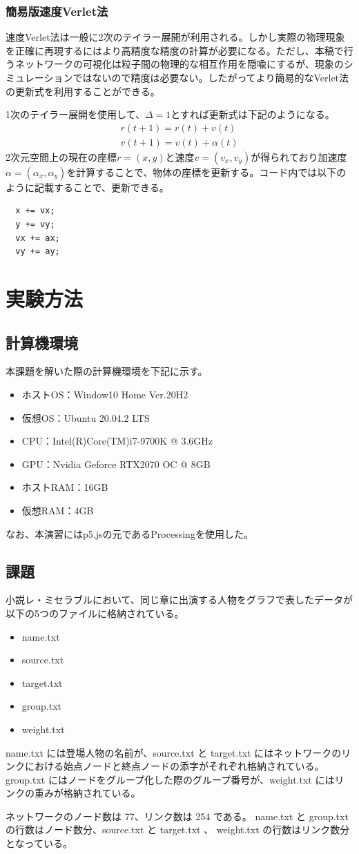 \documentclass[dvipdfmx]{jsarticle}
\begin{document}
\subsubsection{簡易版速度Verlet法}
速度Verlet法は一般に2次のテイラー展開が利用される。しかし実際の物理現象を正確に再現するにはより高精度な精度の計算が必要になる。ただし、本稿で行うネットワークの可視化は粒子間の物理的な相互作用を隠喩にするが、現象のシミュレーションではないので精度は必要ない。したがってより簡易的なVerlet法の更新式を利用することができる。\par
1次のテイラー展開を使用して、$\Delta = 1$とすれば更新式は下記のようになる。
\begin{gather*}
  r(t + 1) = r(t) + v(t)\\
  v(t + 1) = v(t) + \alpha(t)
\end{gather*}
2次元空間上の現在の座標$r = (x, y)$と速度$v = (v_{x}, v_{y})$が得られており加速度$\alpha =(\alpha_{x}, \alpha_{y})$を計算することで、物体の座標を更新する。コード内では以下のように記載することで、更新できる。
\begin{verbatim}
  x += vx;
  y += vy;
  vx += ax;
  vy += ay;
\end{verbatim}
\section{実験方法}
\subsection{計算機環境}
本課題を解いた際の計算機環境を下記に示す。
\begin{itemize}
  \item ホストOS：Window10 Home Ver.20H2
  \item 仮想OS：Ubuntu 20.04.2 LTS
  \item CPU：Intel(R)Core(TM)i7-9700K @ 3.6GHz
  \item GPU：Nvidia Geforce RTX2070 OC @ 8GB
  \item ホストRAM：16GB
  \item 仮想RAM：4GB
\end{itemize}
なお、本演習にはp5.jsの元であるProcessingを使用した。
\subsection{課題}
小説レ・ミセラブルにおいて、同じ章に出演する人物をグラフで表したデータが以下の5つのファイルに格納されている。
\begin{itemize}
  \item name.txt
  \item source.txt
  \item target.txt
  \item group.txt
  \item weight.txt
\end{itemize}
name.txt には登場人物の名前が、source.txt と target.txt にはネットワークのリンクにおける始点ノードと終点ノードの添字がそれぞれ格納されている。 group.txt にはノードをグループ化した際のグループ番号が、weight.txt にはリンクの重みが格納されている。\par
ネットワークのノード数は 77、リンク数は 254 である。 name.txt と group.txt の行数はノード数分、source.txt と target.txt 、 weight.txt の行数はリンク数分となっている。
\end{document}
